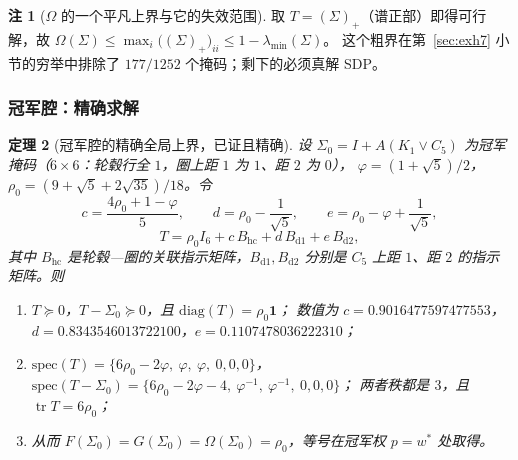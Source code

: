 \documentclass[UTF8,11pt]{ctexart}
\newtheorem{theorem}{定理}[section]
\theoremstyle{definition}
\newtheorem{remark}[theorem]{注}
\newcommand{\tr}{\operatorname{tr}}
\newcommand{\one}{\mathbf{1}}
\begin{document}
\begin{remark}[$\Omega$ 的一个平凡上界与它的失效范围]\label{rmk:aplus}
取 $T=(\Sigma)_+$（谱正部）即得可行解，故 $\Omega(\Sigma)\le\max_i\bigl((\Sigma)_+\bigr)_{ii}\le1-\lambda_{\min}(\Sigma)$。
这个粗界在第~\ref{sec:exh7} 小节的穷举中排除了 $177/1252$ 个掩码；剩下的必须真解 SDP。
\end{remark}

\subsubsection*{冠军腔：精确求解}

\begin{theorem}[冠军腔的精确全局上界，已证且精确]\label{thm:champglobal}
设 $\Sigma_0=I+A(K_1\vee C_5)$ 为冠军掩码（$6\times6$：轮毂行全 $1$，圈上距 $1$ 为 $1$、距 $2$ 为 $0$），
$\varphi=(1+\sqrt5)/2$，$\rho_0=(9+\sqrt5+2\sqrt{35})/18$。令
\[
c=\frac{4\rho_0+1-\varphi}{5},\qquad
d=\rho_0-\frac1{\sqrt5},\qquad
e=\rho_0-\varphi+\frac1{\sqrt5},
\]
\[
T=\rho_0I_6+c\,B_{\mathrm{hc}}+d\,B_{\mathrm{d1}}+e\,B_{\mathrm{d2}},
\]
其中 $B_{\mathrm{hc}}$ 是轮毂—圈的关联指示矩阵，$B_{\mathrm{d1}},B_{\mathrm{d2}}$ 分别是 $C_5$ 上距 $1$、距 $2$ 的指示矩阵。则
\begin{enumerate}[label=(\alph*),leftmargin=2em,itemsep=1pt]
\item $T\succeq0$，$T-\Sigma_0\succeq0$，且 $\mathrm{diag}(T)=\rho_0\one$；
      数值为 $c=0.9016477597477553$，$d=0.8343546013722100$，$e=0.1107478036222310$；
\item $\mathrm{spec}(T)=\{6\rho_0-2\varphi,\ \varphi,\ \varphi,\ 0,0,0\}$，
      $\mathrm{spec}(T-\Sigma_0)=\{6\rho_0-2\varphi-4,\ \varphi^{-1},\ \varphi^{-1},\ 0,0,0\}$；
      两者秩都是 $3$，且 $\tr T=6\rho_0$；
\item 从而 $F(\Sigma_0)=G(\Sigma_0)=\Omega(\Sigma_0)=\rho_0$，等号在冠军权 $p=w^*$ 处取得。
\end{enumerate}
\end{theorem}
\end{document}
